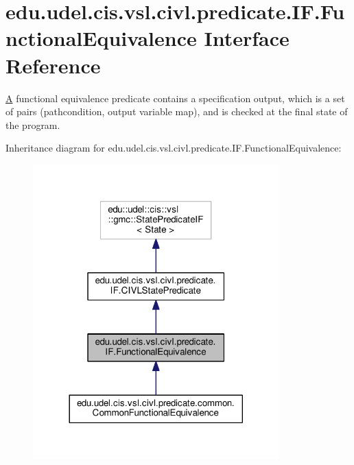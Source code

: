 \hypertarget{interfaceedu_1_1udel_1_1cis_1_1vsl_1_1civl_1_1predicate_1_1IF_1_1FunctionalEquivalence}{}\section{edu.\+udel.\+cis.\+vsl.\+civl.\+predicate.\+I\+F.\+Functional\+Equivalence Interface Reference}
\label{interfaceedu_1_1udel_1_1cis_1_1vsl_1_1civl_1_1predicate_1_1IF_1_1FunctionalEquivalence}


\hyperlink{structA}{A} functional equivalence predicate contains a specification output, which is a set of pairs (pathcondition, output variable map), and is checked at the final state of the program.  




Inheritance diagram for edu.\+udel.\+cis.\+vsl.\+civl.\+predicate.\+I\+F.\+Functional\+Equivalence\+:
\nopagebreak
\begin{figure}[H]
\begin{center}
\leavevmode
\includegraphics[width=269pt]{interfaceedu_1_1udel_1_1cis_1_1vsl_1_1civl_1_1predicate_1_1IF_1_1FunctionalEquivalence__inherit__graph}
\end{center}
\end{figure}


